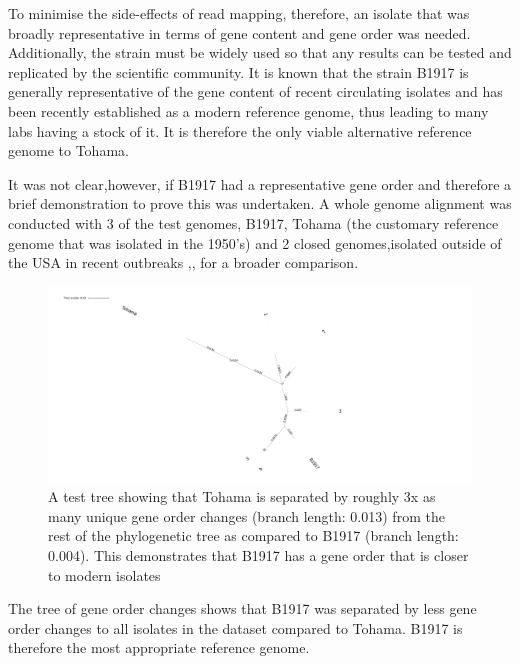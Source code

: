 \documentclass{article}
\begin{document}
To minimise the side-effects of read mapping, therefore, an isolate that was broadly representative in terms of gene content and gene order was needed. Additionally, the strain must be widely used so that any results can be tested and replicated by the scientific community. It is known that the strain B1917 is generally representative of the gene content of recent circulating isolates and has been recently established as a modern reference genome, thus leading to many labs having a stock of it. It is therefore the only viable alternative reference genome to Tohama. 



It was not clear,however, if B1917 had a representative gene order and therefore a brief demonstration to prove this was undertaken. A whole genome alignment was conducted with 3 of the test genomes, B1917\cite{Bart2014CompleteLineages}, Tohama\cite{Parkhill2003ComparativeBronchiseptica.} (the customary reference genome that was isolated in the 1950's) and 2 closed genomes,isolated outside of the USA in recent outbreaks \cite{Dienstbier2018ComparativePertussis},\cite{}, for a broader comparison.



\begin{figure}[h!]
\centering
\includegraphics[width=\textwidth{}]{Chapter_1/VwSDoN3HlH4ng9uLHTKImg.png}
\caption{A test tree showing that Tohama is separated by roughly 3x as many unique gene order changes (branch length: 0.013) from the rest of the phylogenetic tree as compared to B1917 (branch length: 0.004). This demonstrates that B1917 has a gene order that is closer to modern isolates}
\label{fig:Gene_order_tree}
\end{figure}

The tree of gene order changes shows that B1917 was separated by less gene order changes to all isolates in the dataset compared to Tohama. B1917 is therefore the most appropriate reference genome. 
\end{document}
